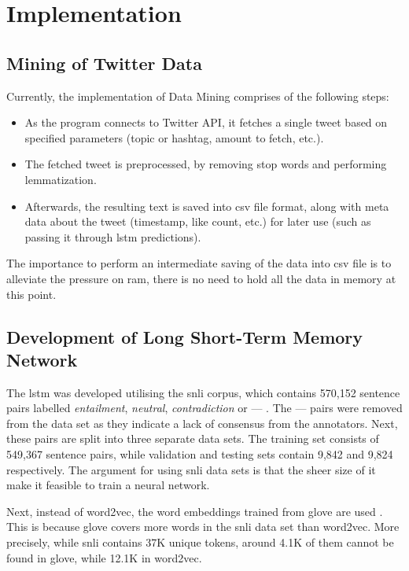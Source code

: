 \section{Implementation}
    \subsection{Mining of Twitter Data} \label{twitterdata}
        Currently, the implementation of Data Mining comprises of the following steps:
        \begin{itemize}
            \item As the program connects to Twitter API, it fetches a single tweet based on specified parameters (topic or hashtag, amount to fetch, etc.).
            
            \item The fetched tweet is preprocessed, by removing stop words and performing lemmatization.
            
            \item Afterwards, the resulting text is saved into \gls{csv} file format, along with meta data about the tweet (timestamp, like count, etc.) for later use (such as passing it through \gls{lstm} predictions).
        \end{itemize}
        
        The importance to perform an intermediate saving of the data into \gls{csv} file is to alleviate the pressure on \gls{ram}, there is no need to hold all the data in memory at this point.
        
    \subsection{Development of Long Short-Term Memory Network} \label{devlstm}
        The \gls{lstm} was developed utilising the \gls{snli} corpus, which contains 570,152 sentence pairs labelled \textit{entailment}, \textit{neutral}, \textit{contradiction} or --- \autocite{Bowman2015ALA}. The --- pairs were removed from the data set as they indicate a lack of consensus from the annotators. Next, these pairs are split into three separate data sets. The training set consists of 549,367 sentence pairs, while validation and testing sets contain 9,842 and 9,824 respectively. The argument for using \gls{snli} data sets is that the sheer size of it make it feasible to train a neural network.
        
        Next, instead of word2vec, the word embeddings trained from \gls{glove} are used \autocite{Pennington2014GloveGV}. This is because \gls{glove} covers more words in the \gls{snli} data set than word2vec. More precisely, while \gls{snli} contains 37K unique tokens, around 4.1K of them cannot be found in \gls{glove}, while 12.1K in word2vec.
        
